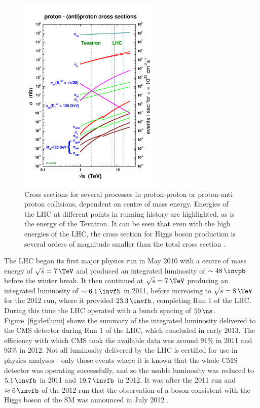 \begin{figure}[htbp]
   \includegraphics[width=0.6\textwidth]{plots/detector/crosssections2012_v5.pdf}
\caption[Cross sections for several processes in proton-proton or proton-anti
proton collisions, dependent on centre of mass energy.]
{Cross sections for several processes in proton-proton or proton-anti
proton collisions, dependent on centre of mass energy. Energies of the LHC at
different points in running history are highlighted, as is the energy of the
Tevatron. It can be seen that even with the high energies of the LHC, the
cross section for Higgs boson production is several orders of magnitude smaller than
the total cross section \cite{stirling:xsecs}.}
\label{fig:LHCcrosssections}
\end{figure}

The LHC began its first major physics run in May 2010 with a centre of mass
energy of $\sqrt{s} = 7\,\TeV$ and produced an integrated luminosity of
$\sim48\,\invpb$ before the winter break. It then continued at $\sqrt{s} = 7\,\TeV$
producing an integrated luminosity of $\sim6.1\,\invfb$ in 2011, before increasing to
$\sqrt{s} = 8\,\TeV$ for the 2012 run, where it provided $23.3\,\invfb$,
completing Run 1 of the LHC.
During this time the LHC operated with a bunch spacing of $50\,\ns$. 
Figure~\ref{fig:detlumi} shows the summary of the
integrated luminosity delivered to the CMS detector during Run 1 of the LHC,
which concluded in early 2013. The efficiency with which CMS took the available
data was around $91\%$ in 2011 and $93\%$ in 2012. Not all luminosity delivered by the LHC is
certified for use in physics analyses - only those events where it is known that
the whole CMS detector was operating successfully, and so the usable luminosity
was reduced to $5.1\,\invfb$ in 2011 and $19.7\,\invfb$ in 2012.
It was after the 2011 run and $\approx6\,\invfb$ of the 2012 run that the
observation of a boson consistent with the Higgs boson of the \ac{SM} was
announced in July 2012 \cite{CMSobservation125,ATLASobservation125}. 

